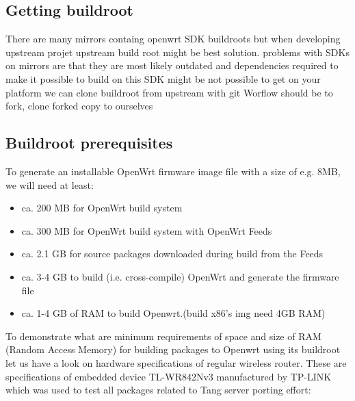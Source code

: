 \subsection{Getting buildroot}

There are many mirrors containg openwrt SDK buildroots but when developing upstream projet upstream build root might be best solution.
problems with SDKs on mirrors are that they are most likely outdated and dependencies required to make it possible to build on this SDK might be not possible to get on your platform
we can clone buildroot from upstream with git Worflow should be to fork, clone forked copy to ourselves

\subsection{Buildroot prerequisites}

To generate an installable OpenWrt firmware image file with a size of e.g. 8MB, we will need at least:

\begin{itemize}
\item ca. 200 MB for OpenWrt build system
\item ca. 300 MB for OpenWrt build system with OpenWrt Feeds
\item ca. 2.1 GB for source packages downloaded during build from the Feeds
\item ca. 3-4 GB to build (i.e. cross-compile) OpenWrt and generate the firmware file
\item ca. 1-4 GB of RAM to build Openwrt.(build x86's img need 4GB RAM)
\end{itemize}

To demonstrate what are minimum requirements of space and size of RAM (Random Access Memory) for building packages to Openwrt using its buildroot let us have a look on hardware specifications of regular wireless router.
These are specifications of embedded device TL-WR842Nv3 manufactured by TP-LINK which was used to test all packages related to Tang server porting effort:

